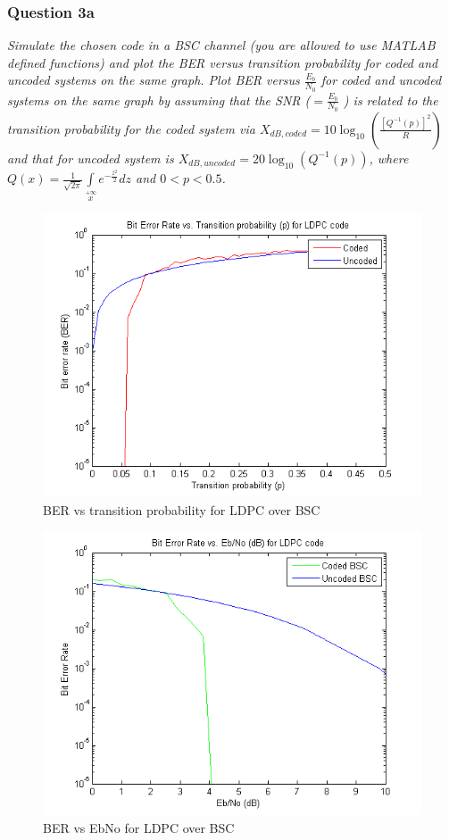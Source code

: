 \documentclass[a4paper]{article}
\begin{document}
\subsubsection{Question 3a}\textit{Simulate the chosen code in a BSC channel (you are allowed to use MATLAB defined functions) and plot the BER versus transition probability for coded and uncoded systems on the same graph. Plot BER versus $\frac{E_b}{N_0}$ for coded and uncoded systems on the same graph by assuming that the SNR ($ = \frac{E_b}{N_0}$ ) is related to the transition probability for the coded system via $X_{dB,coded} = 10 \log_{10}(\frac{[Q^{-1} (p)]^2}{R}) $ and that for uncoded system is $X_{dB,uncoded} = 20\log_{10}(Q^{-1} (p)) $, where $Q(x) = \frac{1}{\sqrt{2 \pi}} \int\limits_{x}\limits^{+\infty} e^{ -\frac{z^2}{2}} dz $ and $0 < p < 0.5$.}

\begin{figure}[H]
\centering
\includegraphics[scale=0.5]{plots/ber_vs_p_ldpc.png}
\caption{BER vs transition probability for LDPC over BSC}
\end{figure}

\begin{figure}[H]
\centering
\includegraphics[scale=0.5]{plots/ber_vs_ebno_ldpc.png}
\caption{BER vs EbNo for LDPC over BSC}
\end{figure}
\end{document}
